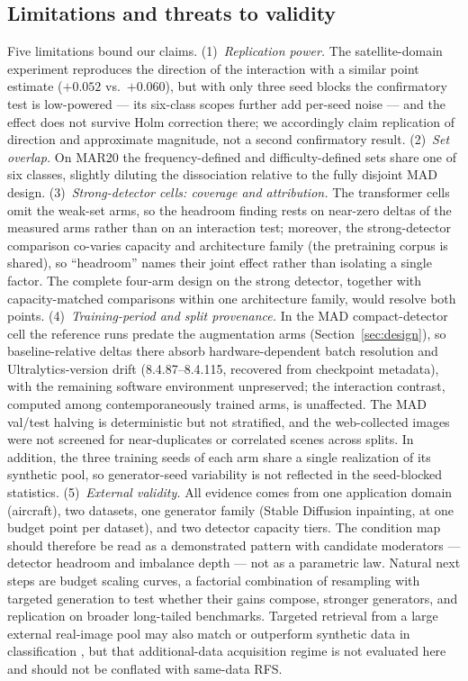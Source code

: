 \documentclass[preprint,12pt,authoryear]{elsarticle}
\begin{document}
\subsection{Limitations and threats to validity}\label{sec:limitations}

Five limitations bound our claims. (1)~\emph{Replication power.} The
satellite-domain experiment reproduces the direction of the interaction
with a similar point estimate ($+0.052$ vs.\ $+0.060$), but with only
three seed blocks the confirmatory test is low-powered --- its
six-class scopes further add per-seed noise --- and the effect does not
survive Holm correction there; we accordingly claim replication of
direction and approximate magnitude, not a second confirmatory
result. (2)~\emph{Set
overlap.} On MAR20 the frequency-defined and difficulty-defined sets
share one of six classes, slightly diluting the dissociation relative to
the fully disjoint MAD design. (3)~\emph{Strong-detector cells: coverage
and attribution.} The transformer cells omit the weak-set arms, so the
headroom finding rests on near-zero deltas of the measured arms rather
than on an interaction test; moreover, the strong-detector comparison
co-varies capacity and architecture family (the pretraining corpus is
shared), so ``headroom'' names their joint effect rather than isolating
a single factor. The complete four-arm design on the strong detector,
together with capacity-matched comparisons within one architecture
family, would resolve both points. (4)~\emph{Training-period and split provenance.} In the MAD
compact-detector cell the reference runs predate the augmentation arms
(Section~\ref{sec:design}), so baseline-relative deltas there absorb
hardware-dependent batch resolution and Ultralytics-version drift
(8.4.87--8.4.115, recovered from checkpoint metadata), with the
remaining software environment unpreserved; the interaction contrast,
computed among contemporaneously trained arms, is unaffected. The MAD val/test halving is deterministic but not
stratified, and the web-collected images were not screened for
near-duplicates or
correlated scenes across splits. In addition, the three training seeds
of each arm share a single realization of its synthetic pool, so
generator-seed variability is not reflected in the seed-blocked
statistics.
(5)~\emph{External validity.} All evidence comes
from one application domain (aircraft), two datasets, one generator
family (Stable Diffusion inpainting, at one budget point per dataset),
and two detector capacity tiers. The condition map should therefore be
read as a demonstrated pattern with candidate moderators --- detector
headroom and imbalance depth --- not as a parametric law. Natural next
steps are budget scaling curves, a factorial combination of resampling
with targeted generation to test whether their gains compose, stronger
generators, and replication on broader long-tailed benchmarks. Targeted
retrieval from a large external real-image pool may also match or
outperform synthetic data in classification \citep{geng2024unmet}, but
that additional-data acquisition regime is not evaluated here and should
not be conflated with same-data RFS.
\end{document}
